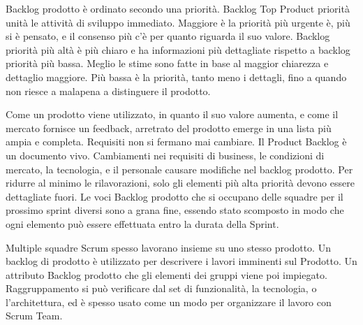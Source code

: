Backlog prodotto \`e ordinato secondo una priorit\`a. Backlog Top Product priorit\`a unit\`a le attivit\`a di sviluppo
immediato. Maggiore \`e la priorit\`a pi\`u urgente \`e, pi\`u si \`e pensato, e il consenso pi\`u c'\`e per quanto
riguarda il suo valore. Backlog priorit\`a pi\`u alt\`a \`e pi\`u chiaro e ha informazioni pi\`u dettagliate rispetto a
backlog priorit\`a pi\`u bassa. Meglio le stime sono fatte in base al maggior chiarezza e dettaglio maggiore. Pi\`u
bassa \`e la priorit\`a, tanto meno i dettagli, fino a quando non riesce a malapena a distinguere il prodotto.\\
\linebreak

Come un prodotto viene utilizzato, in quanto il suo valore aumenta, e come il mercato fornisce un feedback, arretrato
del prodotto emerge in una lista pi\`u ampia e completa. Requisiti non si fermano mai cambiare. Il Product Backlog \`e
un documento vivo. Cambiamenti nei requisiti di business, le condizioni di mercato, la tecnologia, e il personale
causare modifiche nel backlog prodotto. Per ridurre al minimo le rilavorazioni, solo gli elementi pi\`u alta priorit\`a
devono essere dettagliate fuori. Le voci Backlog prodotto che si occupano delle squadre per il prossimo sprint diversi
sono a grana fine, essendo stato scomposto in modo che ogni elemento pu\`o essere effettuata entro la durata della
Sprint.

\vspace{0.4cm}
\vspace{0.4cm}
\linebreak

Multiple squadre Scrum spesso lavorano insieme su uno stesso prodotto. Un backlog di prodotto \`e utilizzato per
descrivere i lavori imminenti sul Prodotto. Un attributo Backlog prodotto che gli elementi dei gruppi viene poi
impiegato. Raggruppamento si pu\`o verificare dal set di funzionalit\`a, la tecnologia, o l'architettura, ed \`e spesso
usato come un modo per organizzare il lavoro con Scrum Team.

\vspace{0.4cm}
\vspace{0.4cm}
\linebreak

